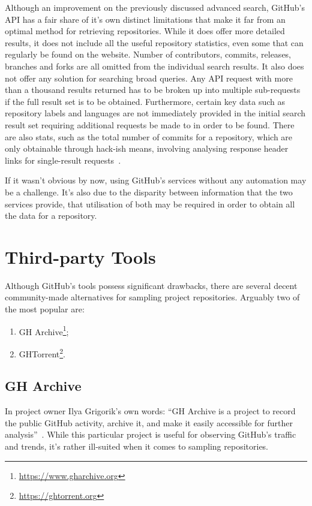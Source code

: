 Although an improvement on the previously discussed advanced search, GitHub's API has a fair share of it's own distinct limitations that make it far from an optimal method for retrieving repositories.
While it does offer more detailed results, it does not include all the useful repository statistics, even some that can regularly be found on the website.
Number of contributors, commits, releases, branches and forks are all omitted from the individual search results.
It also does not offer any solution for searching broad queries.
Any API request with more than a thousand results returned has to be broken up into multiple sub-requests if the full result set is to be obtained.
Furthermore, certain key data such as repository labels and languages are not immediately provided in the initial search result set requiring additional requests be made to in order to be found.
There are also stats, such as the total number of commits for a repository, which are only obtainable through hack-ish means, involving analysing response header links for single-result requests~\cite{GIST1}.

If it wasn't obvious by now, using GitHub's services without any automation may be a challenge.
It's also due to the disparity between information that the two services provide, that utilisation of both may be required in order to obtain all the data for a repository.

\section{Third-party Tools}

Although GitHub's tools possess significant drawbacks, there are several decent community-made alternatives for sampling project repositories.
Arguably two of the most popular are:
\begin{enumerate}
    \item GH Archive\footnote{\url{https://www.gharchive.org}};
    \item GHTorrent\footnote{\url{https://ghtorrent.org}}.
\end{enumerate}

\subsection{GH Archive}

In project owner Ilya Grigorik's own words: ``GH Archive is a project to record the public GitHub activity, archive it, and make it easily accessible for further analysis''~\cite{GHA}.
While this particular project is useful for observing GitHub's traffic and trends, it's rather ill-suited when it comes to sampling repositories.

